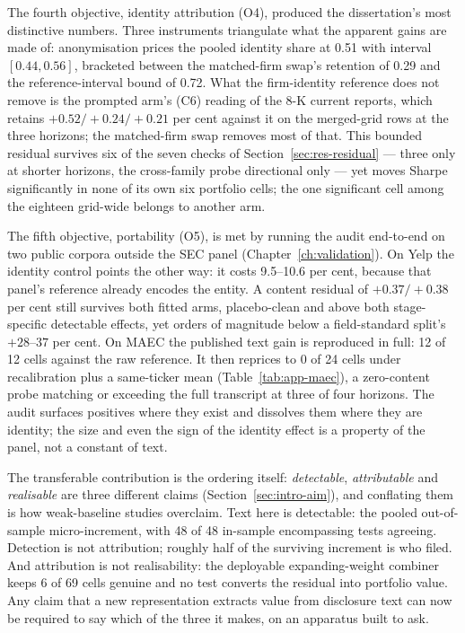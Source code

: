 The fourth objective, identity attribution (O4), produced the dissertation's most distinctive numbers. Three instruments triangulate what the apparent gains are made of: anonymisation prices the pooled identity share at 0.51 with interval $[0.44,0.56]$, %
bracketed between the matched-firm swap's retention of 0.29 and the reference-interval bound of 0.72. %
What the firm-identity reference does not remove is the prompted arm's (C6)
reading of the 8-K current reports, which retains $+0.52/+0.24/+0.21$ per cent against it
on the merged-grid rows at the three horizons; the matched-firm swap removes most of that. %
This bounded residual survives six of the seven checks of Section~\ref{sec:res-residual} --- three only at shorter horizons, the cross-family probe directional only --- yet moves Sharpe significantly in none of its own six portfolio cells; the one significant cell among the eighteen grid-wide belongs to another arm. %

The fifth objective, portability (O5), is met by running the audit end-to-end on two public corpora outside the SEC panel (Chapter~\ref{ch:validation}). On Yelp the identity control points the other way: it costs 9.5--10.6 per cent, because that panel's reference already encodes the entity. A content residual of $+0.37/+0.38$ per cent still survives both fitted arms, placebo-clean and above both stage-specific detectable effects, yet orders of magnitude below a field-standard split's $+28$--$37$ per cent. %
On MAEC the published text gain is reproduced in full: 12 of 12 cells against the raw reference. It then reprices to 0 of 24 cells under recalibration plus a same-ticker mean (Table~\ref{tab:app-maec}), a zero-content probe matching or exceeding the full transcript at three of four horizons. %
The audit surfaces positives where they exist and dissolves them where they are identity; the size and even the sign of the identity effect is a property of the panel, not a constant of text.

The transferable contribution is the ordering itself: \emph{detectable}, \emph{attributable} and \emph{realisable} are three different claims (Section~\ref{sec:intro-aim}), and conflating them is how weak-baseline studies overclaim. Text here is detectable: the pooled out-of-sample micro-increment, with 48 of 48 in-sample encompassing tests agreeing. %
Detection is not attribution; roughly half of the surviving increment is who filed. And attribution is not realisability: the deployable expanding-weight combiner keeps 6 of 69 cells genuine %
and no test converts the residual into portfolio value. Any claim that a new representation extracts value from disclosure text can now be required to say which of the three it makes, on an apparatus built to ask.

